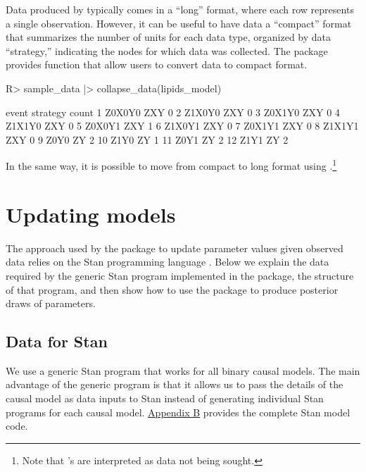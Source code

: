 \documentclass[
  11pt,
  article]{jss}
\renewcommand{\texttt}[1]{\code{#1}}
\begin{document}
Data produced by \texttt{make\_data()} typically comes in a ``long''
format, where each row represents a single observation. However, it can
be useful to have data a ``compact'' format that summarizes the number
of units for each data type, organized by data ``strategy,'' indicating
the nodes for which data was collected. The  package
provides function \texttt{collapse\_data()} that allow users to convert
data to compact format.

\begin{CodeChunk}
\begin{CodeInput}
R> sample_data |> collapse_data(lipids_model)
\end{CodeInput}

\begin{CodeOutput}
    event strategy count
1  Z0X0Y0      ZXY     0
2  Z1X0Y0      ZXY     0
3  Z0X1Y0      ZXY     0
4  Z1X1Y0      ZXY     0
5  Z0X0Y1      ZXY     1
6  Z1X0Y1      ZXY     0
7  Z0X1Y1      ZXY     0
8  Z1X1Y1      ZXY     0
9    Z0Y0       ZY     2
10   Z1Y0       ZY     1
11   Z0Y1       ZY     2
12   Z1Y1       ZY     2
\end{CodeOutput}
\end{CodeChunk}

In the same way, it is possible to move from compact to long format
using \texttt{expand\_data()}.\footnote{Note that \texttt{NA}'s are
  interpreted as data not being sought.}

\section{Updating models}\label{sec-update}

The approach used by the  package to update parameter
values given observed data relies on the Stan programming language
\citep{carpenter_stan_2017}. Below we explain the data required by the
generic Stan program implemented in the package, the structure of that
program, and then show how to use the package to produce posterior draws
of parameters.

\subsection{Data for Stan}\label{data-for-stan}

We use a generic Stan program that works for all binary causal models.
The main advantage of the generic program is that it allows us to pass
the details of the causal model as data inputs to Stan instead of
generating individual Stan programs for each causal model.
\hyperref[sec-stancode]{Appendix B} provides the complete Stan model
code.
\end{document}
